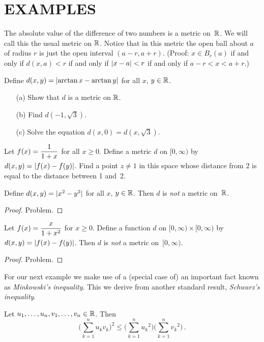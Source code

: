\section{EXAMPLES}
\begin{exam}\label{met_r} The absolute value of the difference of two numbers is a metric on~$\mathbb{R}$.
We will call this the usual metric on $\mathbb{R}$.  Notice that in this metric the open ball about
$a$ of radius $r$ is just the open interval $(a - r,a + r)$. (Proof: $x \in B_r(a)$ if and
only if $d(x,a) <r$ if and only if $\lvert x - a\rvert < r$ if and only if $a - r < x < a + r$.)
\end{exam}

\begin{prob} Define $d(x,y) = \lvert\arctan x - \arctan y\rvert$ for all $x$, $y \in \mathbb{R}$.
 \begin{enumerate}
  \item[(a)] Show that $d$ is a metric on $\mathbb{R}$.
  \item[(b)] Find $d(-1,\sqrt 3)$.
  \item[(c)] Solve the equation $d(x,0) = d(x,\sqrt 3)$.
 \end{enumerate}
\end{prob}

\begin{prob} Let $f(x) = \dfrac1{\mathstrut1+x}$ for all $x \ge 0$. Define a metric $d$ on
$[0,\infty)$ by $d(x,y) = \lvert f(x) - f(y)\rvert$. Find a point $z \ne 1$ in this space whose
distance from 2 is equal to the distance between 1 and~2.
\end{prob}

\begin{exam} Define $d(x,y) = \lvert x^2 - y^2\rvert$ for all $x$, $y \in \mathbb{R}$.  Then $d$ is
\emph{not} a metric on~$\mathbb{R}$.
\end{exam}

\begin{proof} Problem. \ns  \end{proof}

\begin{exam} Let $f(x) = \dfrac x{\mathstrut1+x^2}$ for $x \ge 0$. Define a function $d$
on $[0,\infty) \times [0,\infty)$ by $d(x,y) = \lvert f(x)- f(y)\rvert$.  Then $d$ is \emph{not} a
metric on~$[0,\infty)$.
\end{exam}

\begin{proof} Problem.  \ns  \end{proof}

For our next example we make use of a (special case of) an important fact known as
\emph{Minkowski's inequality}. This we derive from another standard result, \emph{Schwarz's
inequality}.
\begin{prop}\label{Schwarz} Let $u_1,\dots,u_n, v_1, \dots, v_n \in \mathbb{R}$.
Then
  \[ \biggl(\sum_{k=1}^n u_kv_k \biggr)^2
          \le \biggl(\sum_{k=1}^n{u_k}^2 \biggr)\biggl(\sum_{k=1}^n {v_k}^2\biggr)\,. \]
\end{prop}

